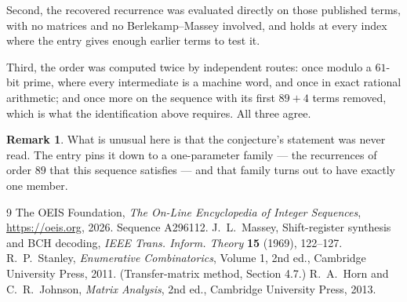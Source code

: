 \documentclass[11pt,a4paper]{article}
\theoremstyle{plain}
\theoremstyle{definition}
\newtheorem{remark}[theorem]{Remark}
\begin{document}
Second, the recovered recurrence was evaluated directly on those published terms, with no
matrices and no Berlekamp--Massey involved, and holds at every index where the entry gives
enough earlier terms to test it.

Third, the order was computed twice by independent routes: once modulo a $61$-bit prime, where
every intermediate is a machine word, and once in exact rational arithmetic; and once more on
the sequence with its first $89+4$ terms removed, which is what the identification above
requires. All three agree.

\begin{remark}
What is unusual here is that the conjecture's statement was never read. The entry pins it down
to a one-parameter family --- the recurrences of order $89$ that this sequence satisfies
--- and that family turns out to have exactly one member.
\end{remark}

\begin{thebibliography}{9}
 The OEIS Foundation, \emph{The On-Line Encyclopedia of Integer
Sequences}, \url{https://oeis.org}, 2026. Sequence A296112.
 J.~L.~Massey, Shift-register synthesis and BCH decoding, \emph{IEEE
Trans. Inform. Theory} \textbf{15} (1969), 122--127.
 R.~P.~Stanley, \emph{Enumerative Combinatorics}, Volume 1, 2nd ed.,
Cambridge University Press, 2011. (Transfer-matrix method, Section 4.7.)
 R.~A.~Horn and C.~R.~Johnson, \emph{Matrix Analysis}, 2nd ed., Cambridge
University Press, 2013.
\end{thebibliography}
\end{document}
